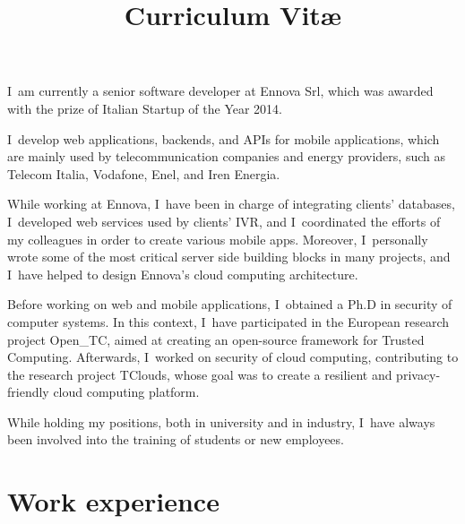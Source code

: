 \documentclass[a4paper,sans]{moderncv} %
\title{Curriculum Vit\ae}
\newcommand{\experience}{Experience}
\newcommand{\otc}{Open\_TC}
\renewcommand{\experience}{Esperienze di lavoro}
\renewcommand{\experience}{Work experience}
\begin{document}
\maketitle

\justify
I~am currently a senior software developer at Ennova Srl,
  which was awarded with the prize of Italian Startup of the Year 2014.

  I~develop web applications, backends, and APIs for mobile applications,
  which are mainly used by telecommunication companies and energy providers,
  such as Telecom Italia, Vodafone, Enel, and Iren Energia.

  While working at Ennova, I~have been in charge of integrating clients' databases,
  I~developed web services used by clients’ IVR,
  and I~coordinated the efforts of my colleagues in order to create various mobile apps.
  Moreover, I~personally wrote some of the most critical server side building blocks in many projects,
  and I~have helped to design Ennova's cloud computing architecture.

  Before working on web and mobile applications, I~obtained a Ph.D in security of computer systems.
  In this context, I~have participated in the European research project \otc,
  aimed at creating an open-source framework for Trusted Computing.
  Afterwards, I~worked on security of cloud computing, contributing to the research project TClouds,
  whose goal was to create a resilient and privacy-friendly cloud computing platform.

  While holding my positions, both in university and in industry,
  I~have always been involved into the training of students or new employees.

  \section{\experience}

\end{document}
